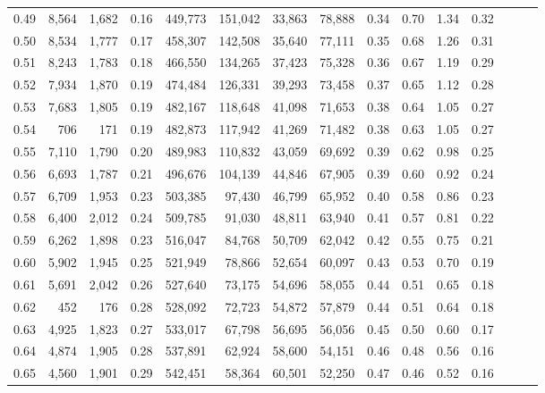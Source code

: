 \begin{tabular}{rrrrrrrrrrrrrrr}
0.49 &   8,564 &  1,682 &  0.16 &  449,773 &  151,042 &   33,863 &   78,888 &  0.34 &  0.70 &  1.34 &      0.32 \\
0.50 &   8,534 &  1,777 &  0.17 &  458,307 &  142,508 &   35,640 &   77,111 &  0.35 &  0.68 &  1.26 &      0.31 \\
0.51 &   8,243 &  1,783 &  0.18 &  466,550 &  134,265 &   37,423 &   75,328 &  0.36 &  0.67 &  1.19 &      0.29 \\
0.52 &   7,934 &  1,870 &  0.19 &  474,484 &  126,331 &   39,293 &   73,458 &  0.37 &  0.65 &  1.12 &      0.28 \\
0.53 &   7,683 &  1,805 &  0.19 &  482,167 &  118,648 &   41,098 &   71,653 &  0.38 &  0.64 &  1.05 &      0.27 \\
0.54 &     706 &    171 &  0.19 &  482,873 &  117,942 &   41,269 &   71,482 &  0.38 &  0.63 &  1.05 &      0.27 \\
0.55 &   7,110 &  1,790 &  0.20 &  489,983 &  110,832 &   43,059 &   69,692 &  0.39 &  0.62 &  0.98 &      0.25 \\
0.56 &   6,693 &  1,787 &  0.21 &  496,676 &  104,139 &   44,846 &   67,905 &  0.39 &  0.60 &  0.92 &      0.24 \\
0.57 &   6,709 &  1,953 &  0.23 &  503,385 &   97,430 &   46,799 &   65,952 &  0.40 &  0.58 &  0.86 &      0.23 \\
0.58 &   6,400 &  2,012 &  0.24 &  509,785 &   91,030 &   48,811 &   63,940 &  0.41 &  0.57 &  0.81 &      0.22 \\
0.59 &   6,262 &  1,898 &  0.23 &  516,047 &   84,768 &   50,709 &   62,042 &  0.42 &  0.55 &  0.75 &      0.21 \\
0.60 &   5,902 &  1,945 &  0.25 &  521,949 &   78,866 &   52,654 &   60,097 &  0.43 &  0.53 &  0.70 &      0.19 \\
0.61 &   5,691 &  2,042 &  0.26 &  527,640 &   73,175 &   54,696 &   58,055 &  0.44 &  0.51 &  0.65 &      0.18 \\
0.62 &     452 &    176 &  0.28 &  528,092 &   72,723 &   54,872 &   57,879 &  0.44 &  0.51 &  0.64 &      0.18 \\
0.63 &   4,925 &  1,823 &  0.27 &  533,017 &   67,798 &   56,695 &   56,056 &  0.45 &  0.50 &  0.60 &      0.17 \\
0.64 &   4,874 &  1,905 &  0.28 &  537,891 &   62,924 &   58,600 &   54,151 &  0.46 &  0.48 &  0.56 &      0.16 \\
0.65 &   4,560 &  1,901 &  0.29 &  542,451 &   58,364 &   60,501 &   52,250 &  0.47 &  0.46 &  0.52 &      0.16 \\

\end{tabular}
